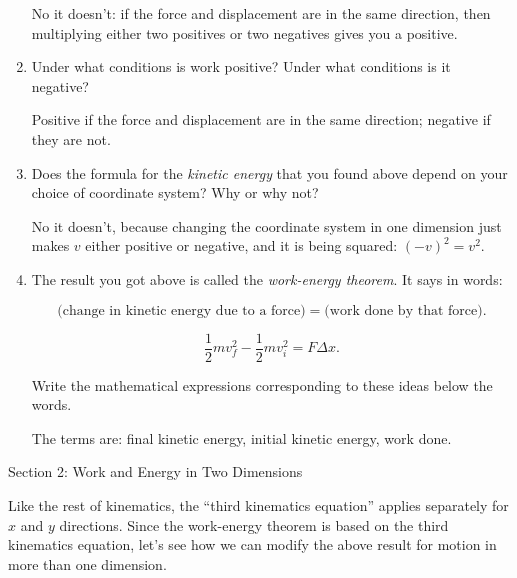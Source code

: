 \documentclass[12pt]{article}
\begin{document}
\begin{enumerate}
	{\color{Red} No it doesn't: if the force and displacement are in the same direction, then multiplying either two positives or two negatives gives you a positive.}
	
	

	\item Under what conditions is work positive? Under what conditions is it negative?
	
	{\color{Red}Positive if the force and displacement are in the same direction; negative if they are not.}
	
	
	\item Does the formula for the {\it kinetic energy} that you found above depend on your choice of coordinate system? Why or why not?
	
{\color{Red} No it doesn't, because changing the coordinate system in one dimension just makes $v$ either positive or negative, and it is being squared: $(-v)^2 = v^2$.}
	
	\item The result you got above is called the {\it work-energy theorem}. It says in words:
	
	$$\text{(change in kinetic energy due to a force)} = \text{(work done by that force)}.$$
	{
	\color{Red}
	
	$$\frac{1}{2}mv_f^2 - \frac{1}{2}mv_i^2 = F \Delta x.$$
	

}
	
	Write the mathematical expressions corresponding to these ideas below the words.
	
	{\color{Red} 	The terms are: final kinetic energy, initial kinetic energy, work done.}
\end{enumerate}

\newpage


{\Large Section 2: Work and Energy in Two Dimensions}

 Like the rest of kinematics, the ``third kinematics equation'' applies separately for $x$ and $y$ directions. Since the work-energy theorem is based on the third kinematics equation, let's see how we can modify the above result for motion in more than one dimension.
\end{document}
